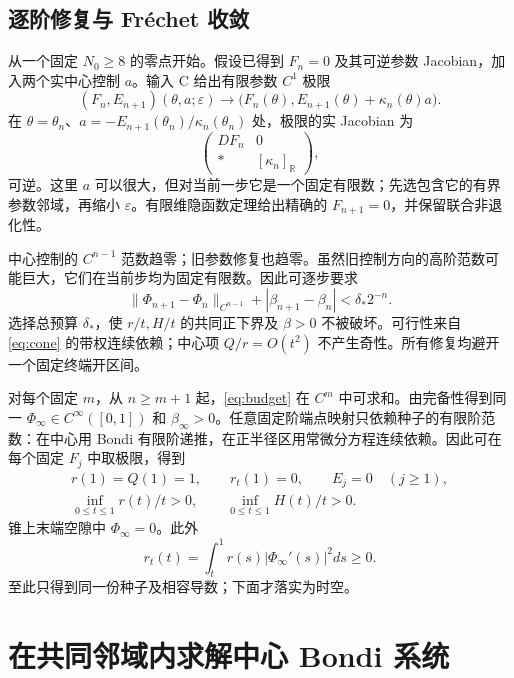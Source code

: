 \subsection{逐阶修复与 Fr\'echet 收敛}
从一个固定 $N_0\ge8$ 的零点开始。假设已得到 $F_n=0$ 及其可逆参数 Jacobian，加入两个实中心控制 $a$。输入 C 给出有限参数 $C^1$ 极限
\[
(F_n,E_{n+1})(\theta,a;\varepsilon)
\longrightarrow
\big(F_n(\theta),E_{n+1}(\theta)+\kappa_n(\theta)a\big).
\]
在 $\theta=\theta_n$、$a=-E_{n+1}(\theta_n)/\kappa_n(\theta_n)$ 处，极限的实 Jacobian 为
\[
\begin{pmatrix}DF_n&0\\ *&[\kappa_n]_{\mathbb R}\end{pmatrix},
\]
可逆。这里 $a$ 可以很大，但对当前一步它是一个固定有限数；先选包含它的有界参数邻域，再缩小 $\varepsilon$。有限维隐函数定理给出精确的 $F_{n+1}=0$，并保留联合非退化性。

中心控制的 $C^{n-1}$ 范数趋零；旧参数修复也趋零。虽然旧控制方向的高阶范数可能巨大，它们在当前步均为固定有限数。因此可逐步要求
\begin{equation}\label{eq:budget}
\|\Phi_{n+1}-\Phi_n\|_{C^{n-1}}+|\beta_{n+1}-\beta_n|
<\delta_*2^{-n}.
\end{equation}
选择总预算 $\delta_*$，使 $r/t,H/t$ 的共同正下界及 $\beta>0$ 不被破坏。可行性来自 \eqref{eq:cone} 的带权连续依赖；中心项 $Q/r=O(t^2)$ 不产生奇性。所有修复均避开一个固定终端开区间。

对每个固定 $m$，从 $n\ge m+1$ 起，\eqref{eq:budget} 在 $C^m$ 中可求和。由完备性得到同一 $\Phi_\infty\in C^\infty([0,1])$ 和 $\beta_\infty>0$。任意固定阶端点映射只依赖种子的有限阶范数：在中心用 Bondi 有限阶递推，在正半径区用常微分方程连续依赖。因此可在每个固定 $F_j$ 中取极限，得到
\begin{equation}\label{eq:infinitecone}
\begin{gathered}
r(1)=Q(1)=1,\qquad r_t(1)=0,\qquad E_j=0\quad(j\ge1),\\
\inf_{0\le t\le1}r(t)/t>0,\qquad
\inf_{0\le t\le1}H(t)/t>0.
\end{gathered}
\end{equation}
锥上末端空隙中 $\Phi_\infty=0$。此外
\[
r_t(t)=\int_t^1r(s)|\Phi_\infty'(s)|^2ds\ge0.
\]
至此只得到同一份种子及相容导数；下面才落实为时空。

\section{在共同邻域内求解中心 Bondi 系统}

